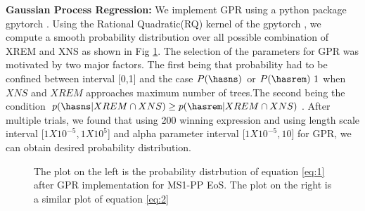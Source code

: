 \textbf{Gaussian Process Regression:} We implement GPR using a python package gpytorch \cite{gpytorch}. Using the Rational Quadratic(RQ) kernel of the gpytorch , we compute a smooth probability distribution over all possible combination of XREM and XNS as shown in Fig \ref{fig:probability}. The selection of the parameters for GPR was motivated by two major factors. The first being that probability had to be confined between interval [0,1] and the case $P(\hasns)$ or $P(\hasrem) ~ 1$ when $XNS$ and $XREM$ approaches maximum number of trees.The second being the condition $p(\hasns| XREM \cap XNS) \geq p(\hasrem| XREM \cap XNS)$. After multiple trials, we found that using 200 winning expression and using length scale interval [$1X10^{-5}, 1X10^{5}$] and alpha parameter interval [$1X10^{-5}, 10$] for GPR, we can obtain desired probability distribution.

\begin{figure}[htp]
  \centering
  \quad
  \caption{The plot on the left is the probability distrbution of equation \ref{eq:1} after GPR implementation for MS1-PP EoS.  The plot on the right is a similar plot of equation \ref{eq:2}  }
  \label{fig:probability}
\end{figure}


